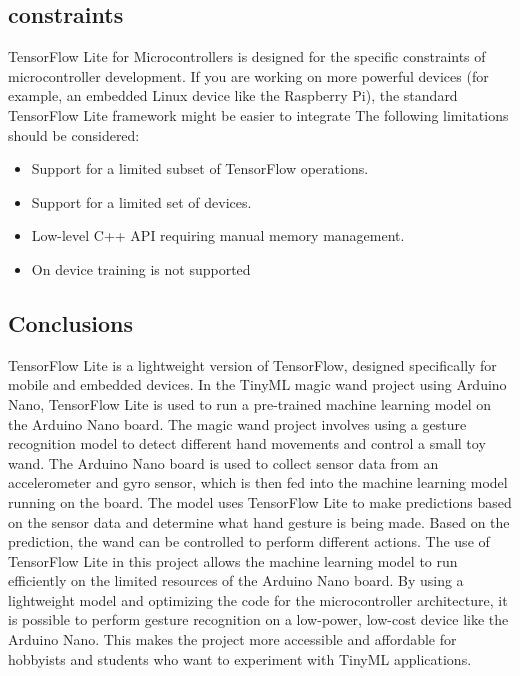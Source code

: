 \subsection{constraints}

TensorFlow Lite for Microcontrollers is designed for the specific constraints of microcontroller development.\cite{TensorFlow:2023} If you are working on more powerful devices (for example, an embedded Linux device like the Raspberry Pi), the standard TensorFlow Lite framework might be easier to integrate The following limitations should be considered:

\begin{itemize}
	
	\item Support for a limited subset of TensorFlow operations.
	
	\item Support for a limited set of devices.
	
	\item Low-level C++ API requiring manual memory management.
	
	\item On device training is not supported
	
\end{itemize}

\subsection{Conclusions}
TensorFlow Lite is a lightweight version of TensorFlow, designed specifically for mobile and embedded devices. In the TinyML magic wand
project using Arduino Nano, TensorFlow Lite is used to run a pre-trained
machine learning model on the Arduino Nano board.
The magic wand project involves using a gesture recognition model
to detect different hand movements and control a small toy wand. The
Arduino Nano board is used to collect sensor data from an accelerometer
and gyro sensor, which is then fed into the machine learning model running
on the board. The model uses TensorFlow Lite to make predictions based
on the sensor data and determine what hand gesture is being made. Based
on the prediction, the wand can be controlled to perform different actions.
The use of TensorFlow Lite in this project allows the machine learning
model to run efficiently on the limited resources of the Arduino Nano
board. By using a lightweight model and optimizing the code for the
microcontroller architecture, it is possible to perform gesture recognition
on a low-power, low-cost device like the Arduino Nano. This makes the
project more accessible and affordable for hobbyists and students who
want to experiment with TinyML applications.\cite{Magicwand:2024}




